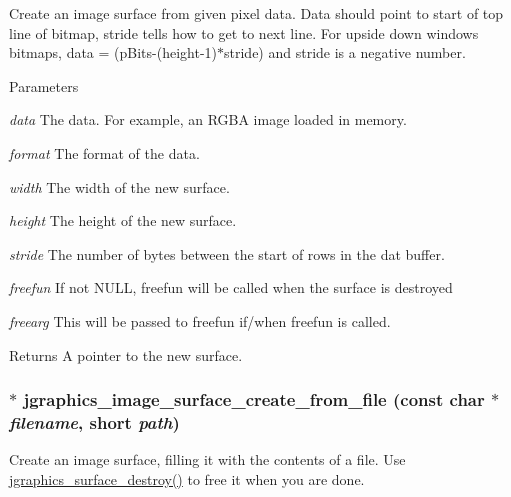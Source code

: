 Create an image surface from given pixel data. Data should point to start of top line of bitmap, stride tells how to get to next line. For upside down windows bitmaps, data = (pBits-\/(height-\/1)$\ast$stride) and stride is a negative number.


\begin{DoxyParams}{Parameters}
\item[{\em data}]The data. For example, an RGBA image loaded in memory. \item[{\em format}]The format of the data. \item[{\em width}]The width of the new surface. \item[{\em height}]The height of the new surface. \item[{\em stride}]The number of bytes between the start of rows in the dat buffer. \item[{\em freefun}]If not NULL, freefun will be called when the surface is destroyed \item[{\em freearg}]This will be passed to freefun if/when freefun is called. \end{DoxyParams}
\begin{DoxyReturn}{Returns}
A pointer to the new surface. 
\end{DoxyReturn}
\hypertarget{group__jsurface_ga5b9a625daaa6d39d5fe538b714ae1c6f}{
\subsubsection[{jgraphics\_\-image\_\-surface\_\-create\_\-from\_\-file}]{$\ast$ jgraphics\_\-image\_\-surface\_\-create\_\-from\_\-file (const char $\ast$ {\em filename}, \/  short {\em path})}}
\label{group__jsurface_ga5b9a625daaa6d39d5fe538b714ae1c6f}


Create an image surface, filling it with the contents of a file. Use \hyperlink{group__jsurface_ga0fb843ca88d59c3a1c933b18cca41524}{jgraphics\_\-surface\_\-destroy()} to free it when you are done.


